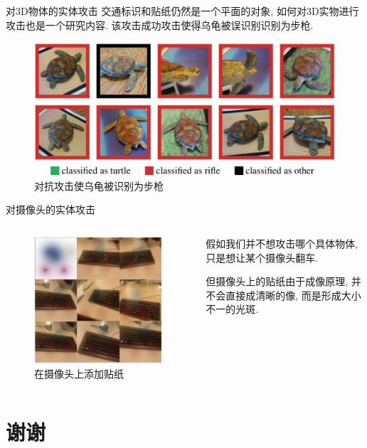 \documentclass[UTF8, aspectratio=169, 10pt, t]{ctexbeamer}
\begin{document}
\begin{frame}{对3D物体的实体攻击}
	交通标识和贴纸仍然是一个平面的对象, 如何对3D实物进行攻击也是一个研究内容. 该攻击成功攻击使得乌龟被误识别识别为步枪.
	\begin{figure}
		\centering
		\includegraphics[width=0.7\linewidth]{phy2}
		\caption{对抗攻击使乌龟被识别为步枪}
		\label{fig:phy2}
	\end{figure}
	
\end{frame}

\begin{frame}{对摄像头的实体攻击}
	\begin{columns}[c]
		\begin{column}{0.5\textwidth}
			\begin{figure}
				\centering
				\includegraphics[width=0.7\linewidth]{phy6}
				\caption{在摄像头上添加贴纸}
				\label{fig:phy6}
			\end{figure}
		\end{column}
		\begin{column}{0.5\textwidth}
			假如我们并不想攻击哪个具体物体, 只是想让某个摄像头翻车.
			
			但摄像头上的贴纸由于成像原理, 并不会直接成清晰的像, 而是形成大小不一的光斑.
		\end{column}
	\end{columns}
\end{frame}

\section{谢谢}
\end{document}
